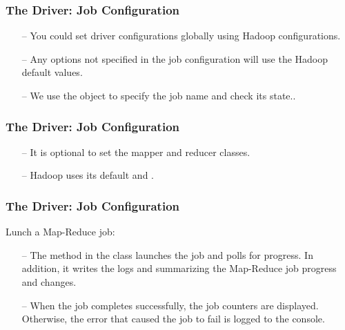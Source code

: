 \begin{frame}[c]{ }
	\frametitle{The Driver:  Job Configuration }
	
		
		\begin{itemize}  [<+->]

			\item [--] You could set driver configurations globally using Hadoop configurations.
			\item [--] Any options not specified in the job configuration will use the Hadoop default values.
			\item [--] We use the  object to specify the job name and check its state..
		
			
	\end{itemize}
	
\end{frame}
\begin{frame}[c]{ }
	\frametitle{The Driver:  Job Configuration }
	

	\begin{itemize}  [<+->]
		
	\item [--] It is optional to set the mapper and reducer classes.
	\item [--] Hadoop uses its default  and .		
		
	\end{itemize}
	
\end{frame}
\begin{frame}[c]{ }
	\frametitle{The Driver:  Job Configuration }
	
	
	Lunch a Map-Reduce job:
	\begin{itemize}  [<+->]
		
		\item [--] The  method in the  class launches the job and polls for progress. In addition, it writes the logs and summarizing the Map-Reduce job progress and changes.

	\item [--] When the job completes successfully, the job counters are displayed. Otherwise, the error that caused the job to fail is logged to the console.
		
	\end{itemize}
	
\end{frame}
